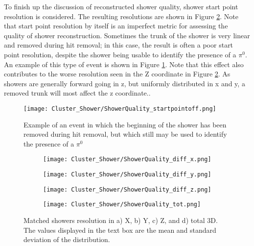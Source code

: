 To finish up the discussion of reconstructed shower quality, shower start point resolution is considered.  The resulting resolutions are shown in Figure \ref{fig:showerquality_xyzres}. Note that start point resolution by itself is an imperfect metric for assessing the quality of shower reconstruction. Sometimes the trunk of the shower is very linear and removed during hit removal; in this case, the result is often a poor start point resolution, despite the shower being usable to identify the presence of a $\pi^0$. An example of this type of event is shown in Figure \ref{fig:showerquality_startpointoff}.  Note that this effect also contributes to the worse resolution seen in the Z coordinate in Figure \ref{fig:showerquality_xyzres}. As showers are generally forward going in z, but uniformly distributed in x and y, a removed trunk will most affect the z coordinate..

\begin{figure}[h!]
\centering
\texttt{[image: Cluster\_Shower/ShowerQuality\_startpointoff.png]}
\caption{Example of an event in which the beginning of the shower has been removed during hit removal, but which still may be used to identify the presence of a $\pi^0$ }
\label{fig:showerquality_startpointoff}
\end{figure}

\begin{figure}[h!]
\centering
  \begin{subfigure}[t]{0.45\textwidth}
    \centering
\texttt{[image: Cluster\_Shower/ShowerQuality\_diff\_x.png]}
  \caption{ }
  \end{subfigure} 
  \hspace{5mm}
  \begin{subfigure}[t]{0.45\textwidth}
    \centering
\texttt{[image: Cluster\_Shower/ShowerQuality\_diff\_y.png]}
  \caption{ }
  \end{subfigure} 
  \hspace{5mm}
  \begin{subfigure}[t]{0.45\textwidth}
    \centering
\texttt{[image: Cluster\_Shower/ShowerQuality\_diff\_z.png]}
  \caption{ }
  \end{subfigure} 
  \hspace{5mm}
  \begin{subfigure}[t]{0.45\textwidth}
    \centering
\texttt{[image: Cluster\_Shower/ShowerQuality\_tot.png]}
  \caption{ }
  \end{subfigure} 
\caption{ Matched showers resolution in a) X, b) Y, c) Z, and d) total 3D. The values displayed in the text box are the mean and standard deviation of the distribution. }
\label{fig:showerquality_xyzres}
\end{figure}

